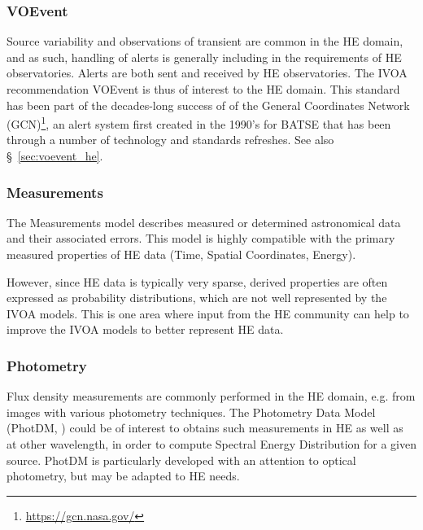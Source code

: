 \documentclass[11pt,a4paper]{ivoa}
\begin{document}
{\subsubsection{VOEvent}

Source variability and observations of transient are common in the \gls{HE} domain, and as such, handling of alerts is generally including in the requirements of \gls{HE} observatories. Alerts are both sent and received by \gls{HE} observatories. The \gls{IVOA} recommendation VOEvent \citep{2017ivoa.spec.0320S} is thus of interest to the \gls{HE} domain.  This standard has been part of the decades-long success of of the General Coordinates Network (GCN)\footnote{\url{https://gcn.nasa.gov/}}, an alert system first created in the 1990's for BATSE \citep{1995Ap&SS.231..235B} that has been through a number of technology and standards refreshes.  See also \S~\ref{sec:voevent_he}. 
 


\subsubsection{Measurements}

The Measurements model \citep{2022ivoa.spec.1004R} describes measured or determined astronomical data and their associated errors.
This model is highly compatible with the primary measured properties of \gls{HE} data (Time, Spatial Coordinates, Energy).

However, since \gls{HE} data is typically very sparse, derived properties are often expressed as probability distributions, which are not
well represented by the \gls{IVOA} models.  This is one area where input from the \gls{HE} community can help to improve the \gls{IVOA} models to better
represent \gls{HE} data.


\subsubsection{Photometry}

Flux density measurements are commonly performed in the \gls{HE} domain, e.g. from images with various photometry techniques. The Photometry Data Model (PhotDM, \citealt{2022ivoa.spec.1101S}) could be of interest to obtains such measurements in \gls{HE} as well as at other wavelength, in order to compute Spectral Energy Distribution for a given source. PhotDM is particularly developed with an attention to optical photometry, but may be adapted to \gls{HE} needs.

}
\end{document}
